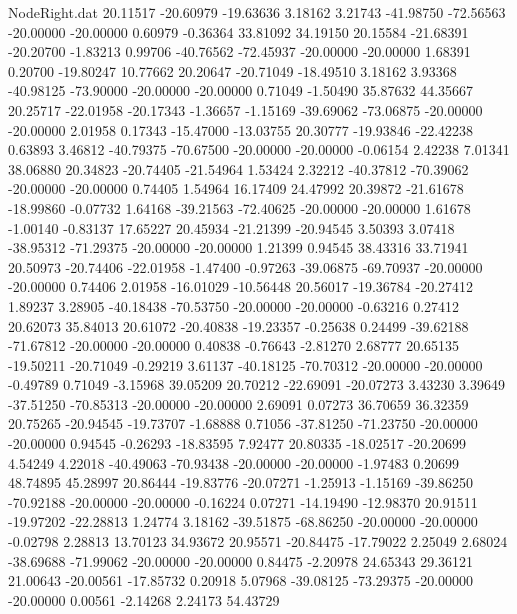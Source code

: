 \begin{filecontents}{NodeRight.dat}
  20.11517  -20.60979  -19.63636     3.18162    3.21743  -41.98750  -72.56563  -20.00000  -20.00000    0.60979   -0.36364   33.81092   34.19150
  20.15584  -21.68391  -20.20700    -1.83213    0.99706  -40.76562  -72.45937  -20.00000  -20.00000    1.68391    0.20700  -19.80247   10.77662
  20.20647  -20.71049  -18.49510     3.18162    3.93368  -40.98125  -73.90000  -20.00000  -20.00000    0.71049   -1.50490   35.87632   44.35667
  20.25717  -22.01958  -20.17343    -1.36657   -1.15169  -39.69062  -73.06875  -20.00000  -20.00000    2.01958    0.17343  -15.47000  -13.03755
  20.30777  -19.93846  -22.42238     0.63893    3.46812  -40.79375  -70.67500  -20.00000  -20.00000   -0.06154    2.42238    7.01341   38.06880
  20.34823  -20.74405  -21.54964     1.53424    2.32212  -40.37812  -70.39062  -20.00000  -20.00000    0.74405    1.54964   16.17409   24.47992
  20.39872  -21.61678  -18.99860    -0.07732    1.64168  -39.21563  -72.40625  -20.00000  -20.00000    1.61678   -1.00140   -0.83137   17.65227
  20.45934  -21.21399  -20.94545     3.50393    3.07418  -38.95312  -71.29375  -20.00000  -20.00000    1.21399    0.94545   38.43316   33.71941
  20.50973  -20.74406  -22.01958    -1.47400   -0.97263  -39.06875  -69.70937  -20.00000  -20.00000    0.74406    2.01958  -16.01029  -10.56448
  20.56017  -19.36784  -20.27412     1.89237    3.28905  -40.18438  -70.53750  -20.00000  -20.00000   -0.63216    0.27412   20.62073   35.84013
  20.61072  -20.40838  -19.23357    -0.25638    0.24499  -39.62188  -71.67812  -20.00000  -20.00000    0.40838   -0.76643   -2.81270    2.68777
  20.65135  -19.50211  -20.71049    -0.29219    3.61137  -40.18125  -70.70312  -20.00000  -20.00000   -0.49789    0.71049   -3.15968   39.05209
  20.70212  -22.69091  -20.07273     3.43230    3.39649  -37.51250  -70.85313  -20.00000  -20.00000    2.69091    0.07273   36.70659   36.32359
  20.75265  -20.94545  -19.73707    -1.68888    0.71056  -37.81250  -71.23750  -20.00000  -20.00000    0.94545   -0.26293  -18.83595    7.92477
  20.80335  -18.02517  -20.20699     4.54249    4.22018  -40.49063  -70.93438  -20.00000  -20.00000   -1.97483    0.20699   48.74895   45.28997
  20.86444  -19.83776  -20.07271    -1.25913   -1.15169  -39.86250  -70.92188  -20.00000  -20.00000   -0.16224    0.07271  -14.19490  -12.98370
  20.91511  -19.97202  -22.28813     1.24774    3.18162  -39.51875  -68.86250  -20.00000  -20.00000   -0.02798    2.28813   13.70123   34.93672
  20.95571  -20.84475  -17.79022     2.25049    2.68024  -38.69688  -71.99062  -20.00000  -20.00000    0.84475   -2.20978   24.65343   29.36121
  21.00643  -20.00561  -17.85732     0.20918    5.07968  -39.08125  -73.29375  -20.00000  -20.00000    0.00561   -2.14268    2.24173   54.43729

\end{filecontents}
